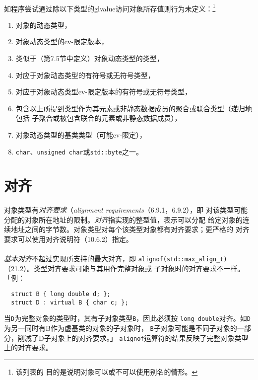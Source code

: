 \paragraph{}
如程序尝试通过除以下类型的glvalue访问对象所存值则行为未定义：\footnote{该列表的
目的是说明对象可以或不可以使用别名的情形。}
\begin{enumerate}
  \item{对象的动态类型，}
  \item{对象动态类型的cv-限定版本，}
  \item{类似于（第7.5节中定义）对象动态类型的类型，}
  \item{对应于对象动态类型的有符号或无符号类型，}
  \item{对应于对象动态类型cv-限定版本的有符号或无符号类型，}
  \item{包含以上所提到类型作为其元素或非静态数据成员的聚合或联合类型（递归地包括
    子聚合或被包含联合的元素或非静态数据成员），}
  \item{对象动态类型的基类类型（可能cv-限定），}
  \item{\texttt{char}、\texttt{unsigned char}或\texttt{std::byte}之一。}
\end{enumerate}

\section{对齐}
\paragraph{}
对象类型有\textit{对齐要求}（\textit{alignment requirements}（6.9.1，6.9.2），即
对该类型可能分配的对象所在地址的限制。\textit{对齐}指实现的整型值，表示可以分配
给定对象的连续地址之间的字节数。对象类型对每个该类型对象都有对齐要求；更严格的
对齐要求可以使用对齐说明符（10.6.2）指定。

\paragraph{}
\textit{基本对齐}不超过实现所支持的最大对齐，即
\texttt{alignof(std::max\_align\_t)}（21.2）。类型对齐要求可能与其用作完整对象或
子对象时的对齐要求不一样。「例：
\begin{lstlisting}
  struct B { long double d; };
  struct D : virtual B { char c; };
\end{lstlisting}
当\texttt{D}为完整对象的类型时，其有子对象类型\texttt{B}，因此必须按
\texttt{long double}对齐。如\texttt{D}为另一同时有B作为虚基类的对象的子对象时，
\texttt{B}子对象可能是不同子对象的一部分，削减了D子对象上的对齐要求。」
\texttt{alignof}运算符的结果反映了完整对象类型上的对齐要求。


